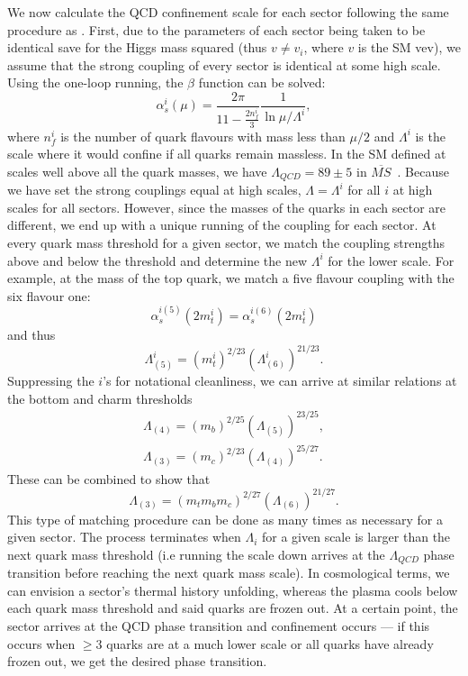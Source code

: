 \documentclass[nofootinbib,twocolumn,preprintnumbers]{revtex4-1}
\begin{document}
We now calculate the QCD confinement scale for each sector following the same procedure as \cite{Cui:2011wk}. First, due to the parameters of each sector being taken to be identical save for the Higgs mass squared (thus $v \neq v_i$, where $v$ is the SM vev), we assume that the strong coupling of every sector is identical at some high scale. Using the one-loop running, the $\beta$ function can be solved:
\begin{equation}\label{eqn:QCDrunningi}
\alpha_{s}^i (\mu) = \frac{2\pi}{11-\frac{2n^i_f}{3}}\frac{1}{\ln{\mu/\Lambda^i}},
\end{equation}
where $n_f^i$ is the number of quark flavours with mass less than $\mu/2$ and $\Lambda^i$ is the scale where it would confine if all quarks remain massless. In the SM defined at scales well above all the quark masses, we have $\Lambda_{QCD} = 89 \pm 5$ in $\overline{MS}$~\cite{PhysRevD.98.030001}. 
Because we have set the strong couplings equal at high scales, $\Lambda = \Lambda^i$ for all $i$ at high scales for all sectors. However, since the masses of the quarks in each sector are different, we end up with a unique running of the coupling for each sector. At every quark mass threshold for a given sector, we match the coupling strengths above and below the threshold and determine the new $\Lambda^i$ for the lower scale. For example, at the mass of the top quark, we match a five flavour coupling with the six flavour one:
\begin{equation}
\alpha_s^{i(5)}(2 m^i_t) = \alpha_s^{i(6)}(2 m^i_t) 
\end{equation} 
and thus
\begin{equation}
\Lambda_{(5)}^i = (m_t^{i})^{2/23}(\Lambda_{(6)}^i)^{21/23}.
\end{equation}
Suppressing the $i$'s for notational cleanliness, we can arrive at similar relations at the bottom and charm thresholds
\begin{equation}
\begin{split}
\Lambda_{(4)} = (m_b)^{2/25}(\Lambda_{(5)})^{23/25},
\\
\Lambda_{(3)} = (m_c)^{2/23}(\Lambda_{(4)})^{25/27}.
\end{split}
\end{equation}
These can be combined to show that
\begin{equation}
\Lambda_{(3)} = (m_t m_b m_c)^{2/27}(\Lambda_{(6)})^{21/27}.
\end{equation}
This type of matching procedure can be done as many times as necessary for a given sector. The process terminates when $\Lambda_i$ for a given scale is larger than the next quark mass threshold (i.e running the scale down arrives at the $\Lambda_{QCD}$ phase transition before reaching the next quark mass scale).
In cosmological terms, we can envision a sector's thermal history unfolding, whereas the plasma cools below each quark mass threshold and said quarks are frozen out. At a certain point, the sector arrives at the QCD phase transition and confinement occurs --- if this occurs when $\geq 3$ quarks are at a much lower scale or all quarks have already frozen out, we get the desired phase transition.   
\end{document}
